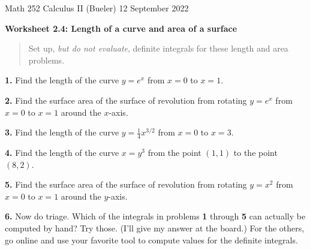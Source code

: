 \documentclass[11pt]{amsart}
\newcommand{\prob}[1]{\bigskip\noindent\textbf{#1.}\quad }
\begin{document}
\scriptsize \noindent Math 252 Calculus II (Bueler) \hfill 12 September 2022 \quad {}
\normalsize\medskip

\Large\centerline{\textbf{Worksheet 2.4: Length of a curve and area of a surface}}
\medskip
\normalsize

\thispagestyle{empty}
\begin{quote}
Set up, \emph{but do not evaluate}, definite integrals for these length and area problems.
\end{quote}
\bigskip

\prob{1}  Find the length of the curve {\large $y=e^x$} from $x=0$ to $x=1$.
\vfill

\prob{2}  Find the surface area of the surface of revolution from rotating {\large $y=e^x$} from $x=0$ to $x=1$ around the $x$-axis.
\vfill

\prob{3}  Find the length of the curve {\large $y=\frac{1}{4} x^{3/2}$} from $x=0$ to $x=3$.
\vfill

\clearpage
\newpage
\prob{4}  Find the length of the curve {\large $x=y^3$} from the point $(1,1)$ to the point $(8,2)$.
\vfill

\prob{5}  Find the surface area of the surface of revolution from rotating {\large $y=x^2$} from $x=0$ to $x=1$ around the $y$-axis.
\vfill

\prob{6}  Now do triage.  Which of the integrals in problems \textbf{1} through \textbf{5} can actually be computed by hand?  Try those.  (I'll give my answer at the board.)  For the others, go online and use your favorite tool to compute values for the definite integrals.
\vspace{4.0in}
\end{document}
